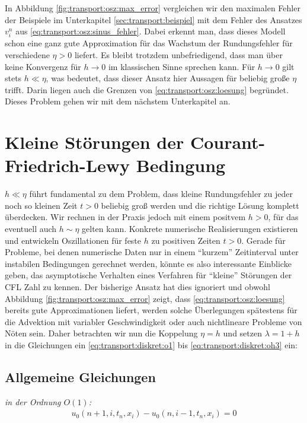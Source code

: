 In Abbildung \ref{fig:transport:osz:max_error} vergleichen wir den maximalen Fehler der Beispiele im Unterkapitel \ref{sec:transport:beispiel} mit dem Fehler des Ansatzes $v^n_i$ aus \eqref{eq:transport:osz:sinus_fehler}.
Dabei erkennt man, dass dieses Modell schon eine ganz gute Approximation für das Wachstum der Rundungsfehler für verschiedene $\eta > 0$ liefert.
Es bleibt trotzdem unbefriedigend, dass man über keine Konvergenz für $h \to 0$ im klassischen Sinne sprechen kann.
Für $h \to 0$ gilt stets $h \ll \eta$, was bedeutet, dass dieser Ansatz hier Aussagen für beliebig große $\eta$ trifft.
Darin liegen auch die Grenzen von \eqref{eq:transport:osz:loesung} begründet.
Dieses Problem gehen wir mit dem nächstem Unterkapitel an.

\section{Kleine Störungen der Courant-Friedrich-Lewy Bedingung}\label{sec:transport:kleineta}

$h \ll \eta$ führt fundamental zu dem Problem, dass kleine Rundungsfehler zu jeder noch so kleinen Zeit $t > 0$ beliebig groß werden und die richtige Lösung komplett überdecken.
Wir rechnen in der Praxis jedoch mit einem positvem $h > 0$, für das eventuell auch $h \sim \eta$ gelten kann.
Konkrete numerische Realisierungen existieren und entwickeln Oszillationen für feste $h$ zu positiven Zeiten $t > 0$.
Gerade für Probleme, bei denen numerische Daten nur in einem ``kurzem'' Zeitinterval unter instabilen Bedingungen gerechnet werden, könnte es also interessante Einblicke geben, das asymptotische Verhalten eines Verfahren für ``kleine'' Störungen der CFL Zahl zu kennen.
Der bisherige Ansatz hat dies ignoriert und obwohl Abbildung \ref{fig:transport:osz:max_error} zeigt, dass \eqref{eq:transport:osz:loesung} bereits gute Approximationen liefert, werden solche Überlegungen spätestens für die Advektion mit variabler Geschwindigkeit oder auch nichtlineare Probleme von Nöten sein.
Daher betrachten wir nun die Koppelung $\eta = h$ und setzen $\lambda = 1 + h$ in die Gleichungen ein \eqref{eq:transport:diskret:o1} bis \eqref{eq:transport:diskret:oh3} ein:

\subsection*{Allgemeine Gleichungen}

\vspace{0.4cm}
\noindent \emph{in der Ordnung $O(1)$:}
\begin{align}\label{eq:transport:kleineta:o1}
u_0(n+1, i, t_n, x_i) - u_0(n, i-1, t_n, x_i) = 0
\end{align}\\


